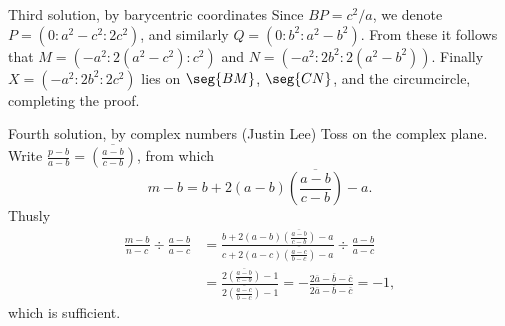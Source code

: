 \begin{customenv}{Third solution, by barycentric coordinates}
    Since $BP=c^2/a$, we denote $P=(0:a^2-c^2:2c^2)$, and similarly $Q=(0:b^2:a^2-b^2)$. From these it follows that $M=\left(-a^2:2(a^2-c^2):c^2\right)$ and $N=\left(-a^2:2b^2:2(a^2-b^2)\right)$. Finally $X=(-a^2:2b^2:2c^2)$ lies on $\seg{BM}$, $\seg{CN}$, and the circumcircle, completing the proof.
\end{customenv}
\begin{customenv}{Fourth solution, by complex numbers (Justin Lee)}
    Toss on the complex plane. Write $\tfrac{p-b}{a-b}=\overline{(\tfrac{a-b}{c-b})}$, from which\[m-b=b+2(a-b)\overline{\left(\frac{a-b}{c-b}\right)}-a.\]Thusly
    \begin{align*}
        \frac{m-b}{n-c}\div\frac{a-b}{a-c}&=\frac{b+2(a-b)\overline{(\frac{a-b}{c-b})}-a}{c+2(a-c)\overline{(\frac{a-c}{b-c})}-a}\div\frac{a-b}{a-c}\\
        &=\frac{2\overline{(\frac{a-b}{c-b})}-1}{2\overline{(\frac{a-c}{b-c})}-1}=-\frac{2\overline a-\overline b-\overline c}{2\overline a-\overline b-\overline c}=-1,
    \end{align*}
    which is sufficient.
\end{customenv}

